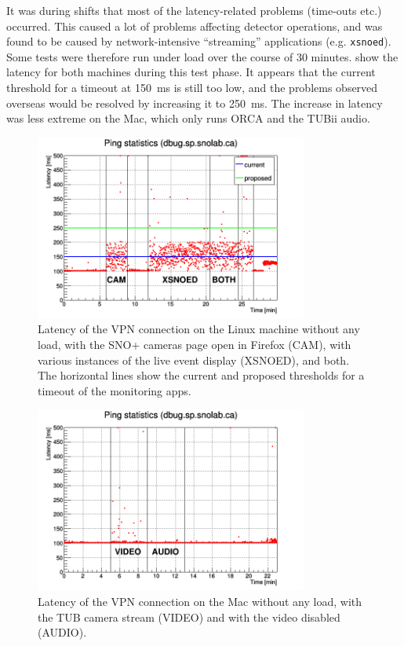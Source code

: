 \documentclass[a4paper,10pt]{article}
\begin{document}
It was during shifts that most of the latency-related problems (time-outs etc.) occurred. This caused a lot of problems affecting detector operations, and was found to be caused by network-intensive ``streaming'' applications (e.g. {\tt xsnoed}). Some tests were therefore run under load over the course of 30 minutes.  show the latency for both machines during this test phase. It appears that the current threshold for a timeout at 150~ms is still too low, and the problems observed overseas would be resolved by increasing it to 250~ms. The increase in latency was less extreme on the Mac, which only runs ORCA and the TUBii audio.

\begin{figure}[htp]
	\centering
	\includegraphics[width=0.8\textwidth,trim={0 3mm 0 1mm},clip]{images/dbug_martti_tests_2}
	\caption{Latency of the VPN connection on the Linux machine without any load, with the SNO+ cameras page open in Firefox (CAM), with various instances of the live event display (XSNOED), and both. The horizontal lines show the current and proposed thresholds for a timeout of the monitoring apps.}
	\label{load_linux}
\end{figure}

\begin{figure}[htp]
	\centering
	\includegraphics[width=0.8\textwidth,trim={0 3mm 0 1mm},clip]{images/dbug_martti_tests_mac}
	\caption{Latency of the VPN connection on the Mac without any load, with the TUB camera stream (VIDEO) and with the video disabled (AUDIO).}
	\label{load_mac}
\end{figure}
\end{document}
